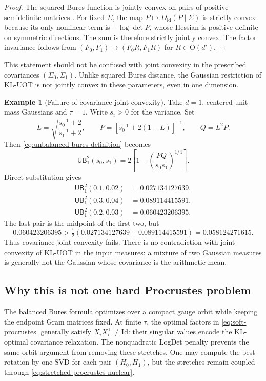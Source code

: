 \documentclass[11pt]{article}
\theoremstyle{definition}
\newtheorem{example}[theorem]{Example}
\theoremstyle{remark}
\newcommand{\Id}{\mathrm{Id}}
\newcommand{\UB}{\mathsf{UB}}
\begin{document}
\begin{proof}
The squared Bures function is jointly convex on pairs of positive
semidefinite matrices \citep{BhatiaJainLim2019}. For fixed $\Sigma$, the map
$P\mapsto D_{\mathrm{ld}}(P\mid\Sigma)$ is strictly convex because its only
nonlinear term is $-\log\det P$, whose Hessian is positive definite on
symmetric directions. The sum is therefore strictly jointly convex. The
factor invariance follows from
$(F_0,F_1)\mapsto(F_0R,F_1R)$ for $R\in\mathrm O(d')$.
\end{proof}

This statement should not be confused with joint convexity in the prescribed
covariances $(\Sigma_0,\Sigma_1)$. Unlike squared Bures distance, the Gaussian
restriction of KL-UOT is not jointly convex in these parameters, even in one
dimension.

\begin{example}[Failure of covariance joint convexity]\label{ex:nonconvex-input-cov}
Take $d=1$, centered unit-mass Gaussians and $\tau=1$. Write $s_i>0$ for the
variance. Set
\[
 L=\sqrt{\frac{s_0^{-1}+2}{s_1^{-1}+2}},
 \qquad
 P=[s_0^{-1}+2(1-L)]^{-1},
 \qquad Q=L^2P.
\]
Then \eqref{eq:unbalanced-bures-definition} becomes
\begin{equation}\label{eq:scalar-unbalanced-bures}
 \UB_1^2(s_0,s_1)
 =2\left[1-\left(\frac{PQ}{s_0s_1}\right)^{1/4}\right].
\end{equation}
Direct substitution gives
\begin{align*}
 \UB_1^2(0.1,0.02)&=0.027134127639,\\
 \UB_1^2(0.3,0.04)&=0.089114415591,\\
 \UB_1^2(0.2,0.03)&=0.060423206395.
\end{align*}
The last pair is the midpoint of the first two, but
\[
 0.060423206395>
 \tfrac12(0.027134127639+0.089114415591)
 =0.058124271615.
\]
Thus covariance joint convexity fails. There is no contradiction with joint
convexity of KL-UOT in the input measures: a mixture of two Gaussian measures
is generally not the Gaussian whose covariance is the arithmetic mean.
\end{example}

\subsection{Why this is not one hard Procrustes problem}

The balanced Bures formula optimizes over a compact gauge orbit while keeping
the endpoint Gram matrices fixed. At finite $\tau$, the optimal factors in
\eqref{eq:soft-procrustes} generally satisfy
$X_iX_i^\top\neq\Id$: their singular values encode the KL-optimal covariance
relaxation. The nonquadratic LogDet penalty prevents the same orbit argument
from removing these stretches. One may compute the best rotation by one SVD
for each pair $(H_0,H_1)$, but the stretches remain coupled through
\eqref{eq:stretched-procrustes-nuclear}.
\end{document}

